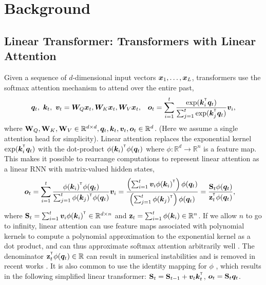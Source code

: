 \vspace{-3mm}

\section{Background}
\vspace{-2mm}
\subsection{Linear Transformer: Transformers with Linear Attention}
\vspace{-2mm}

\label{ssec:la}
Given a sequence of $d$-dimensional input vectors ${\bm{x}}_1,\dots,{\bm{x}}_L$, transformers use the softmax attention mechanism to attend over the entire past,
\vspace{-4mm}
\begin{align*}
\vq_t, \ \vk_t, \ \vv_t &= \mW_Q \vx_t, \mW_K \vx_t, \mW_V \vx_t,  & \vo_t = \sum_{i=1}^{t} \frac{ \exp(\vk_i^{\intercal} \vq_t)}{\sum_{j=1} ^{t} \exp(\vk_j^\intercal  \vq_t)} \vv_i,
\end{align*}
where ${\mathbf{W}}_Q,{\mathbf{W}}_K, {\mathbf{W}}_V \in \mathbb{R}^{d \times d}, 
 {\bm{q}}_t,{\bm{k}}_t,{\bm{v}}_t,{\bm{o}}_t\in \mathbb{R}^d$. (Here we assume a single attention head for simplicity).  Linear attention \cite{katharopoulos_transformers_2020} replaces the exponential kernel $\exp(\vk_i^\intercal \vq_t)$ with the dot-product $\phi(\vk_i)^\intercal \phi(\vq_t)$ where $\phi: \mathbb{R}^d \to \mathbb{R}^{n}$ is a feature map. This makes it possible to rearrange computations to represent linear attention as a linear RNN with matrix-valued hidden states,
\begin{align*}
    \vo_t &= \sum_{i=1}^t \frac{\phi(\vk_i)^{\intercal}\phi(\vq_t)}{\sum_{j=1}^t \phi(\vk_j)^{\intercal}\phi(\vq_t)}\vv_i 
    = \frac{ \left(\sum_{i=1}^t \vv_i \phi( \vk_i)^\intercal \right)\phi(\vq_t)}{\left(\sum_{j=1}^{t}\phi(\vk_j)^{\intercal}\right)\phi(\vq_t)} = \frac{\rmS_t \phi(\vq_t)}{\mathbf{z}^\intercal_t\phi(\vq_t)},
\end{align*}
where $\rmS_t = \sum_{i=1}^t \vv_i \phi(\vk_i)^\intercal \in \mathbb{R}^{d\times n}$ and $\mathbf{z}_t = \sum_{i=1}^t \phi({\bm{k}}_i) \in \mathbb{R}^n$. If we allow  $n$ to go to infinity, linear attention can use  feature maps associated with polynomial kernels to compute a polynomial approximation to the exponential kernel  as a dot product, and can thus approximate softmax attention arbitrarily well \cite{arora_simple_2024}. 
The denominator $\mathbf{z}_t^\intercal \phi(\vq_t) \in \mathbb{R}$
can result in  numerical instabilities \cite{qin_devil_2022} and is  removed in  recent works \cite{schlag_linear_2021,mao_fine-tuning_2022}. It is also common to use the identity mapping for $\phi$ \cite{mao_fine-tuning_2022,sun2023retentive}, which results in the following simplified linear transformer:  $\rmS_t = \rmS_{t-1} + \vv_t  \vk_t^\intercal$, ${\bm{o}}_t = {\mathbf{S}}_t {\bm{q}}_t$.

